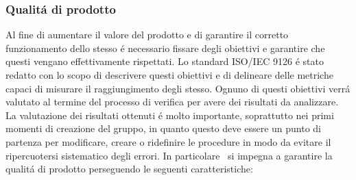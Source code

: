 \subsubsection{Qualit\'a di prodotto}
Al fine di aumentare il valore del prodotto e di garantire il corretto funzionamento dello stesso \'e necessario fissare degli obiettivi e garantire che questi vengano effettivamente rispettati.
Lo standard ISO/IEC 9126 \'e stato redatto con lo scopo di descrivere questi obiettivi e di delineare delle metriche capaci di misurare il raggiungimento degli stesso.
Ognuno di questi obiettivi verr\'a valutato al termine del processo di verifica per avere dei risultati da analizzare. La valutazione dei risultati ottenuti \'e molto importante, soprattutto nei primi momenti di creazione del gruppo, in quanto questo deve essere un punto di partenza per modificare, creare o ridefinire le procedure in modo da evitare il ripercuotersi sistematico degli errori.
In particolare \gruppo ~si impegna a garantire la qualit\'a di prodotto perseguendo le seguenti caratteristiche:
